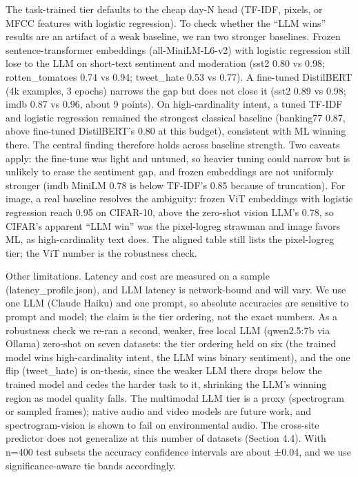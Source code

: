 The task-trained tier defaults to the cheap day-N head (TF-IDF, pixels,
or MFCC features with logistic regression). To check whether the ``LLM
wins'' results are an artifact of a weak baseline, we ran two stronger
baselines. Frozen sentence-transformer embeddings (all-MiniLM-L6-v2)
with logistic regression still lose to the LLM on short-text sentiment
and moderation (sst2 0.80 vs 0.98; rotten\_tomatoes 0.74 vs 0.94;
tweet\_hate 0.53 vs 0.77). A fine-tuned DistilBERT (4k examples, 3
epochs) narrows the gap but does not close it (sst2 0.89 vs 0.98; imdb
0.87 vs 0.96, about 9 points). On high-cardinality intent, a tuned
TF-IDF and logistic regression remained the strongest classical baseline
(banking77 0.87, above fine-tuned DistilBERT's 0.80 at this budget),
consistent with ML winning there. The central finding therefore holds
across baseline strength. Two caveats apply: the fine-tune was light and
untuned, so heavier tuning could narrow but is unlikely to erase the
sentiment gap, and frozen embeddings are not uniformly stronger (imdb
MiniLM 0.78 is below TF-IDF's 0.85 because of truncation). For image, a
real baseline resolves the ambiguity: frozen ViT embeddings with
logistic regression reach 0.95 on CIFAR-10, above the zero-shot vision
LLM's 0.78, so CIFAR's apparent ``LLM win'' was the pixel-logreg
strawman and image favors ML, as high-cardinality text does. The aligned
table still lists the pixel-logreg tier; the ViT number is the
robustness check.

Other limitations. Latency and cost are measured on a sample
(latency\_profile.json), and LLM latency is network-bound and will vary.
We use one LLM (Claude Haiku) and one prompt, so absolute accuracies are
sensitive to prompt and model; the claim is the tier ordering, not the
exact numbers. As a robustness check we re-ran a second, weaker, free
local LLM (qwen2.5:7b via Ollama) zero-shot on seven datasets: the tier
ordering held on six (the trained model wins high-cardinality intent,
the LLM wins binary sentiment), and the one flip (tweet\_hate) is
on-thesis, since the weaker LLM there drops below the trained model and
cedes the harder task to it, shrinking the LLM's winning region as model
quality falls. The multimodal LLM tier is a proxy (spectrogram or
sampled frames); native audio and video models are future work, and
spectrogram-vision is shown to fail on environmental audio. The
cross-site predictor does not generalize at this number of datasets
(Section 4.4). With n=400 test subsets the accuracy confidence intervals
are about ±0.04, and we use significance-aware tie bands accordingly.

